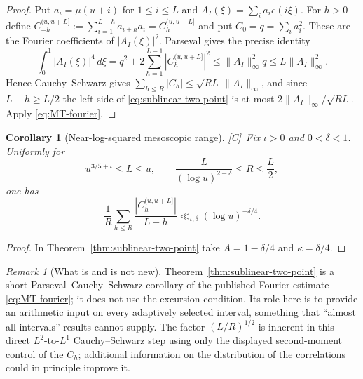 \documentclass[11pt,reqno]{amsart}
\numberwithin{equation}{section}
\theoremstyle{plain}
\newtheorem{corollary}[theorem]{Corollary}
\theoremstyle{definition}
\theoremstyle{remark}
\newtheorem{remark}[theorem]{Remark}
\newcommand{\tagC}{\textup{[C]}}
\begin{document}
\begin{proof}
Put $a_i=\mu(u+i)$ for $1\le i\le L$ and
$A_I(\xi)=\sum_ia_ie(i\xi)$. For $h>0$ define
$C_{-h}^{(u,u+L]}:=\sum_{i=1}^{L-h}a_{i+h}a_i=C_h^{(u,u+L]}$ and put
$C_0=q=\sum_i a_i^2$.  These are the Fourier coefficients of
$|A_I(\xi)|^2$.  Parseval gives the precise identity
\begin{equation}
\int_0^1|A_I(\xi)|^4\,d\xi
=q^2+2\sum_{h=1}^{L-1}|C_h^{(u,u+L]}|^2
\le\|A_I\|_\infty^2q
\le L\|A_I\|_\infty^2.
\end{equation}
Hence Cauchy--Schwarz gives
$\sum_{h\le R}|C_h|\le\sqrt{RL}\,\|A_I\|_\infty$, and since
$L-h\ge L/2$ the left side of \eqref{eq:sublinear-two-point} is at most
$2\|A_I\|_\infty/\sqrt{RL}$. Apply \eqref{eq:MT-fourier}.
\end{proof}

\begin{corollary}[Near-log-squared mesoscopic range]
\label{cor:near-log2-lags}
\tagC\ Fix $\iota>0$ and $0<\delta<1$. Uniformly for
\begin{equation}
u^{3/5+\iota}\le L\le u,
\qquad
\frac{L}{(\log u)^{2-\delta}}\le R\le\frac L2,
\end{equation}
one has
\begin{equation}
\frac1R\sum_{h\le R}\frac{|C^{(u,u+L]}_h|}{L-h}
\ll_{\iota,\delta}(\log u)^{-\delta/4}.
\end{equation}
\end{corollary}

\begin{proof}
In Theorem~\ref{thm:sublinear-two-point} take
$A=1-\delta/4$ and $\kappa=\delta/4$.
\end{proof}

\begin{remark}[What is and is not new]
\label{rem:sublinear-status}
Theorem~\ref{thm:sublinear-two-point} is a short Parseval--Cauchy--Schwarz
corollary of the published Fourier estimate \eqref{eq:MT-fourier}; it does
not use the excursion condition. Its role here is to provide an arithmetic
input on every adaptively selected interval, something that ``almost all
intervals'' results cannot supply. The factor $(L/R)^{1/2}$ is inherent in
this direct $L^2$-to-$L^1$ Cauchy--Schwarz step using only the displayed
second-moment control of the $C_h$; additional information on the
distribution of the correlations could in principle improve it.
\end{remark}
\end{document}
